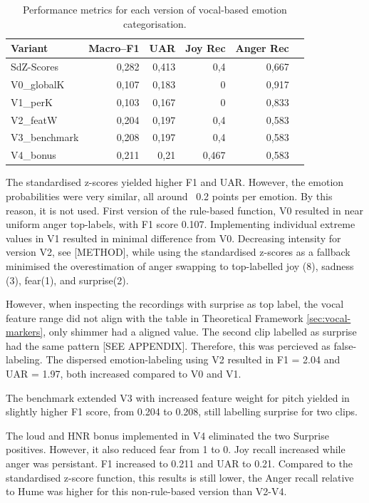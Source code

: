 \begin{table}[ht]
    \centering
    \begin{tabular}{lrrrrr}
      \toprule
      Variant       & Macro–F1 &   UAR  & Joy Rec & Anger Rec  \\
      \midrule
      SdZ-Scores    &   0,282  &  0,413 &    0,4  &     0,667 &        \\
      V0\_globalK   &   0,107  &  0,183 &    0    &     0,917 &        \\
      V1\_perK      &   0,103  &  0,167 &    0    &     0,833 &        \\
      V2\_featW    &   0,204  &  0,197 &    0,4  &     0,583 &        \\
      V3\_benchmark     &   0,208  &  0,197 &    0,4  &     0,583 &        \\
      V4\_bonus   & 0,211 &    0,21 &   0,467 &  0,583 &  \\
      \bottomrule
    \end{tabular}
    \caption{Performance metrics for each version of vocal-based emotion categorisation.}
    \label{tab:rq1_categor.func-stats}
  \end{table}
  The standardised z-scores yielded higher F1 and UAR. However, the emotion probabilities were very similar, all around ~0.2 points per emotion. By this reason, it is not used. 
  First version of the rule-based function, V0 resulted in near uniform anger top-labels, with F1 score 0.107. Implementing individual extreme values in V1 resulted in minimal difference from V0.
  Decreasing intensity for version V2, see [METHOD], while using the standardised z-scores as a fallback minimised the overestimation of anger swapping to top-labelled joy (8), sadness (3), fear(1), and surprise(2).
  
  However, when inspecting the recordings with surprise as top label, the vocal feature range did not align with the table in Theoretical Framework \ref{sec:vocal-markers}, only shimmer had a aligned value. The second 
  clip labelled as surprise had the same pattern [SEE APPENDIX]. Therefore, this was percieved as false-labeling. The dispersed emotion-labeling using V2 resulted in F1 = 2.04 and UAR = 1.97, both increased compared to V0 and V1. 
  
  The benchmark extended V3 with increased feature weight for pitch yielded in slightly higher F1 score, from 0.204 to 0.208, still labelling surprise for two clips. 
  
  The loud and HNR bonus implemented in V4 eliminated the two Surprise positives. However, it also reduced fear from 1 to 0. Joy recall increased while anger was persistant. 
  F1 increased to 0.211 and UAR to 0.21. Compared to the standardised z-score function, this results is still lower, the Anger recall relative to Hume was higher for this non-rule-based version 
  than V2-V4. 

